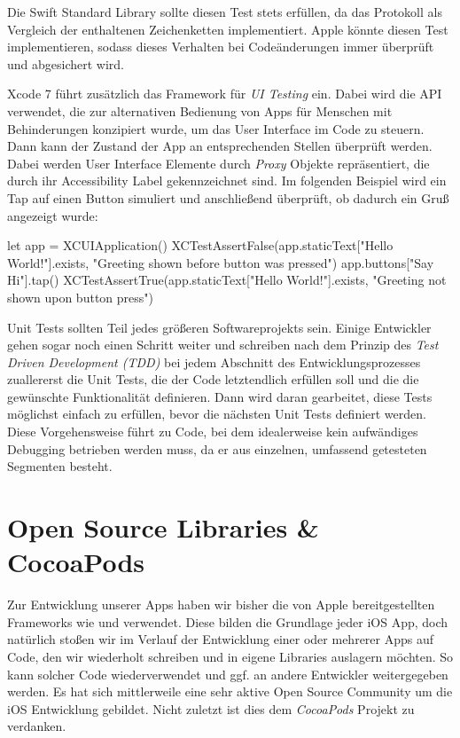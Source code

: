 \documentclass[parskip=half, final]{scrreprt}
\begin{document}
Die Swift Standard Library sollte diesen Test stets erfüllen, da  das  Protokoll als Vergleich der enthaltenen Zeichenketten implementiert. Apple könnte diesen Test implementieren, sodass dieses Verhalten bei Codeänderungen immer überprüft und abgesichert wird.

Xcode 7 führt zusätzlich das  Framework für \emph{UI Testing} ein. Dabei wird die  API verwendet, die zur alternativen Bedienung von Apps für Menschen mit Behinderungen konzipiert wurde, um das User Interface im Code zu steuern. Dann kann der Zustand der App an entsprechenden Stellen überprüft werden. Dabei werden User Interface Elemente durch \emph{Proxy} Objekte repräsentiert, die durch ihr Accessibility Label gekennzeichnet sind. Im folgenden Beispiel wird ein Tap auf einen Button simuliert und anschließend überprüft, ob dadurch ein Gruß angezeigt wurde:

\begin{swiftcode}
let app = XCUIApplication()
XCTestAssertFalse(app.staticText["Hello World!"].exists, "Greeting shown before button was pressed")
app.buttons["Say Hi"].tap()
XCTestAssertTrue(app.staticText["Hello World!"].exists, "Greeting not shown upon button press")
\end{swiftcode}

Unit Tests sollten Teil jedes größeren Softwareprojekts sein. Einige Entwickler gehen sogar noch einen Schritt weiter und schreiben nach dem Prinzip des \emph{Test Driven Development (TDD)}  bei jedem Abschnitt des Entwicklungsprozesses zuallererst die Unit Tests, die der Code letztendlich erfüllen soll und die die gewünschte Funktionalität definieren. Dann wird daran gearbeitet, diese Tests möglichst einfach zu erfüllen, bevor die nächsten Unit Tests definiert werden. Diese Vorgehensweise führt zu Code, bei dem idealerweise kein aufwändiges Debugging betrieben werden muss, da er aus einzelnen, umfassend getesteten Segmenten besteht.


\section{Open Source Libraries \& CocoaPods}

Zur Entwicklung unserer Apps haben wir bisher die von Apple bereitgestellten Frameworks wie  und  verwendet. Diese bilden die Grundlage jeder iOS App, doch natürlich stoßen wir im Verlauf der Entwicklung einer oder mehrerer Apps auf Code, den wir wiederholt schreiben und in eigene Libraries auslagern möchten. So kann solcher Code wiederverwendet und ggf. an andere Entwickler weitergegeben werden. Es hat sich mittlerweile eine sehr aktive Open Source Community um die iOS Entwicklung gebildet. Nicht zuletzt ist dies dem \emph{CocoaPods}  Projekt zu verdanken.
\end{document}
